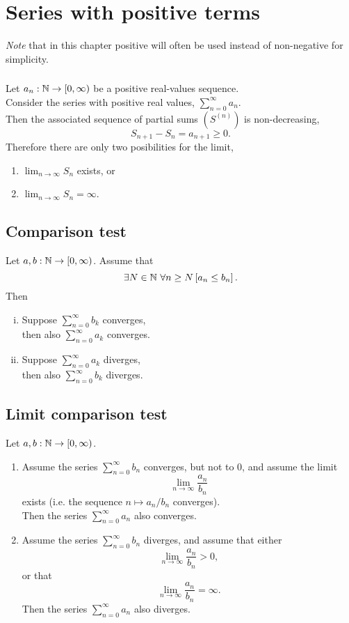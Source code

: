 \section{Series with positive terms}
\emph{Note} that in this chapter positive will often be used instead
of non-negative for simplicity.

\subsubsection*{}
Let $a_n : \mathbb{N} \to [0,\infty)$ be a positive real-values sequence.\\
Consider the series with positive real values, $\sum_{n=0}^{\infty} a_n$.\\
Then the associated sequence of partial sums $(S^{(n)})$ is non-decreasing,
\[
    S_{n+1} - S_n = a_{n+1} \geq 0.
\]
Therefore there are only two posibilities for the limit,
\begin{enumerate}
    \item $\lim_{n \to \infty} S_n$ exists, or
    \item $\lim_{n \to \infty} S_n = \infty$.
\end{enumerate}

\subsection{Comparison test}
\uthm Let $a,b : \mathbb{N} \to [0,\infty)$. Assume that
\[
    \exists N \in \mathbb{N}\ \forall n \geq N \left[ a_n \leq b_n \right].
\]
Then
\begin{enumerate}[(i)]
    \item Suppose $\sum_{n=0}^{\infty} b_k$ converges,\\
        then also $\sum_{n=0}^{\infty} a_k$ converges.
    \item Suppose $\sum_{n=0}^{\infty} a_k$ diverges,\\
        then also $\sum_{n=0}^{\infty} b_k$ diverges.
\end{enumerate}

\subsection{Limit comparison test}
\uthm Let $a,b : \mathbb{N} \to [0,\infty)$.
\begin{enumerate}
    \item Assume the series $\sum_{n=0}^{\infty} b_n$ converges, but not to $0$,
        and assume the limit \[
            \lim_{n \to \infty} \frac{a_n}{b_n} 
        \] exists (i.e. the sequence $n \mapsto a_n / b_n$ converges).\\
        Then the series $\sum_{n=0}^{\infty} a_n$ also converges.
    \item Assume the series $\sum_{n=0}^{\infty} b_n$ diverges, and assume that 
    either \[
        \lim_{n \to \infty} \frac{a_n}{b_n} > 0,
    \] or that \[
        \lim_{n \to \infty} \frac{a_n}{b_n} = \infty.
    \] Then the series $\sum_{n=0}^{\infty} a_n$ also diverges.
\end{enumerate}

